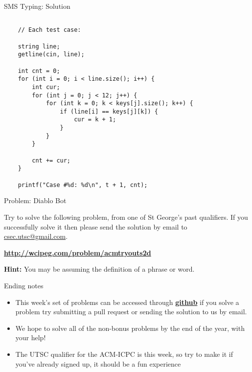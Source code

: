 \documentclass[10pt]{beamer}
\begin{document}
\begin{frame}[fragile]{SMS Typing: Solution}
    \begin{verbatim}

    // Each test case:

    string line;
    getline(cin, line);

    int cnt = 0;
    for (int i = 0; i < line.size(); i++) {
        int cur;
        for (int j = 0; j < 12; j++) {
            for (int k = 0; k < keys[j].size(); k++) {
                if (line[i] == keys[j][k]) {
                    cur = k + 1;
                }
            }
        }

        cnt += cur;
    }

    printf("Case #%d: %d\n", t + 1, cnt);
\end{verbatim}
\end{frame}

\begin{frame}{Problem: Diablo Bot}

{
\small Try to solve the following problem, from one of St George's past qualifiers. If you successfully solve it then please send the solution by email to \href{mailto:csec.utsc@gmail.com}{csec.utsc@gmail.com}.

\begin{center}
\textbf{\href{http://wcipeg.com/problem/acmtryouts2d}{http://wcipeg.com/problem/acmtryouts2d}}
\end{center}

\small \textbf{Hint:} You may be assuming the definition of a phrase or word.

}

\end{frame}



\begin{frame}{Ending notes}

\begin{itemize}
    \item This week's set of problems can be accessed through \textbf{\href{https://github.com/csecutsc/T-414-AFLV/tree/master/01_introduction}{github}} if you solve a problem try submitting a pull request or sending the solution to us by email.
    \item We hope to solve all of the non-bonus problems by the end of the year, with your help!

    \item The UTSC qualifier for the ACM-ICPC is this week, so try to make it if you've already signed up, it should be a fun experience
\end{itemize}


\end{frame}
\end{document}
